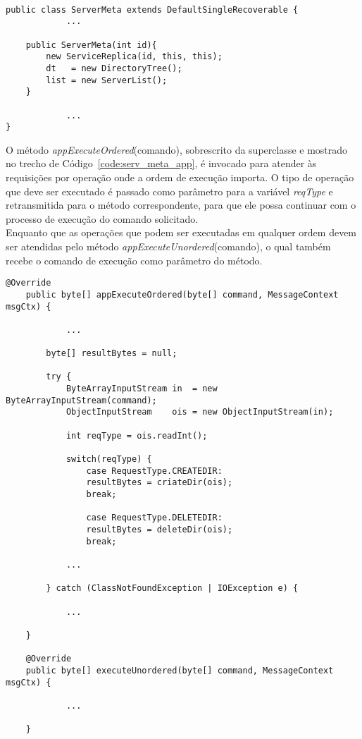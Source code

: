 \begin{lstlisting}[basicstyle=\ttfamily\footnotesize, frame=single, caption=Declaração e construtor da classe ServerMeta, label=code:serv_meta_con]

public class ServerMeta extends DefaultSingleRecoverable {
			...
		
	public ServerMeta(int id){
		new ServiceReplica(id, this, this);
		dt   = new DirectoryTree();
		list = new ServerList(); 
	}

			...
}
\end{lstlisting}	

O método \textit{appExecuteOrdered}(comando), sobrescrito da superclasse e mostrado no trecho de Código~\ref{code:serv_meta_app}, é invocado para atender às requisições por operação onde a ordem de execução importa. O tipo de operação que deve ser executado é passado como parâmetro para a variável \textit{reqType} e retransmitida para o método correspondente, para que ele possa continuar com o processo de execução do comando solicitado. 
\\

Enquanto que as operações que podem ser executadas em qualquer ordem devem ser atendidas pelo método \textit{appExecuteUnordered}(comando), o qual também recebe o comando de execução como parâmetro do método.
\\

\begin{lstlisting}[basicstyle=\ttfamily\footnotesize, frame=single, caption=Métodos para atender às requisições, label=code:serv_meta_app ]		
	@Override
	public byte[] appExecuteOrdered(byte[] command, MessageContext msgCtx) {
				
			...
				
		byte[] resultBytes = null;
		
		try {
			ByteArrayInputStream in  = new ByteArrayInputStream(command);
			ObjectInputStream    ois = new ObjectInputStream(in);
			
			int reqType = ois.readInt();
			
			switch(reqType) {
				case RequestType.CREATEDIR:
				resultBytes = criateDir(ois);
				break;
				
				case RequestType.DELETEDIR:
				resultBytes = deleteDir(ois);
				break;
	
			...
				
		} catch (ClassNotFoundException | IOException e) {
	
			...
			
	}
			
	@Override
	public byte[] executeUnordered(byte[] command, MessageContext msgCtx) {	
	
			...
			
	}
\end{lstlisting}	



